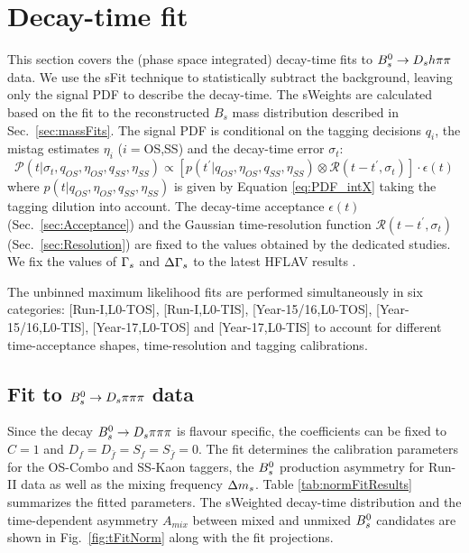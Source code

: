 \section{Decay-time fit}
\label{sec:timeFit}

This section covers the (phase space integrated) decay-time fits to ${{B}^0_{s}}\rightarrow{\ensuremath{{D}_{s}}}{\ensuremath{h}}{\ensuremath{\pi}}{\ensuremath{\pi}}$ data.
We use the \textsf{sFit} technique \cite{Pivk:2004ty} to statistically subtract the background, leaving only the signal PDF to describe the decay-time. 
The \textsf{sWeights} are calculated based on the fit to the reconstructed $B_s$ mass distribution described in Sec.~\ref{sec:massFits}.
The signal PDF is conditional on the tagging decisions $q_i$, the mistag estimates $\eta_i$ ($i=$OS,SS) and the decay-time error $\sigma_t$:
\begin{equation}
\label{eq:TPDF_full}
\mathcal{P}(t \vert \sigma_t, q_{OS}, \eta_{OS}, q_{SS}, \eta_{SS}) \propto \left[ p(t^{'} \vert q_{OS}, \eta_{OS}, q_{SS}, \eta_{SS})  \otimes \mathcal{R}(t - t^{'},\sigma_t) \right] \cdot \epsilon(t)
\end{equation}
where $p(t \vert q_{OS}, \eta_{OS}, q_{SS}, \eta_{SS})$ is given by Equation \ref{eq:PDF_intX} taking the tagging dilution into account.
The decay-time acceptance $\epsilon(t)$ (Sec.~\ref{sec:Acceptance}) and the Gaussian time-resolution function $\mathcal{R}(t - t^{'},\sigma_t)$ (Sec.~\ref{sec:Resolution}) are fixed to the values obtained by the dedicated studies. 
We fix the values of ${\Gamma_{{s}}}$ and ${\Delta\Gamma_{{s}}}$ to the latest HFLAV results \cite{HFAG}.

The  unbinned maximum likelihood fits are performed simultaneously in six categories: 
[Run-I,\textsf{L0-TOS}], [Run-I,\textsf{L0-TIS}], %
 [Year-15/16,\textsf{L0-TOS}], [Year-15/16,\textsf{L0-TIS}],
 [Year-17,\textsf{L0-TOS}] and [Year-17,\textsf{L0-TIS}]
 to account for different time-acceptance shapes, time-resolution and tagging calibrations. 
 
 
\subsection{Fit to ${{B}^0_{s}}\rightarrow{\ensuremath{{D}_{s}}}{\ensuremath{\pi}}{\ensuremath{\pi}}{\ensuremath{\pi}}$ data}  
\label{ssec:timeNormFit}

Since the decay ${{B}^0_{s}}\rightarrow{\ensuremath{{D}_{s}}}{\ensuremath{\pi}}{\ensuremath{\pi}}{\ensuremath{\pi}}$ is flavour specific, the \CP coefficients can be fixed to $C=1$ and $D_{f} = D_{\bar{f}} = S_{f} = S_{\bar{f}} = 0$.
The fit determines the calibration parameters for the OS-Combo and SS-Kaon taggers, the ${{B}^0_{s}}$ production asymmetry for Run-II data as well as the mixing frequency ${\Delta m_{{s}}}$. 
Table \ref{tab:normFitResults} summarizes the fitted parameters. 
The \textsf{sWeighted} decay-time distribution and  the
time-dependent asymmetry $A_{mix}$ between mixed and unmixed ${{B}^0_{s}}$ candidates
are shown in Fig.~\ref{fig:tFitNorm} along with the fit projections.

